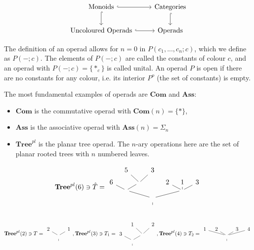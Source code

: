 \[
\begin{tikzcd}
    \text{Monoids} \arrow[r, hook] \arrow[d, hook]
    & \text{Categories} \arrow[d, hook]\\
    \text{Uncoloured Operads} \arrow[r, hook] & \text{Operads}
\end{tikzcd}
\]

The definition of an operad allows for $n = 0$ in $P(c_1,...,c_n;c)$, which we define as $P(-;c)$. The elements of $P(-;c)$ are called the constants of colour $c$, and an operad with $P(-;c) = \{*_c\}$ is called unital. An operad $P$ is open if there are no constants for any colour, i.e. its interior $P^o$ (the set of constants) is empty. 

The most fundamental examples of operads are $\mathbf{Com}$ and $\mathbf{Ass}$:
\begin{itemize}
    \item $\mathbf{Com}$ is the commutative operad with $\mathbf{Com}(n) = \{*\}$,
    \item $\mathbf{Ass}$ is the associative operad with $\mathbf{Ass}(n) = \Sigma_n$
    \item $\mathbf{Tree}^{pl}$ is the planar tree operad. The $n$-ary operations here are the set of planar rooted trees with $n$ numbered leaves. 
\end{itemize}

\[\mathbf{Tree}^{pl}(6) \ni \hat{T} = 
\begin{tikzcd}[column sep=0.8em, row sep=0.4em]
& 5\arrow[dr, dash] & & 3\arrow[dl, dash] &  &  &  \\
6 \arrow[dr, dash] &   & \arrow[dl, dash] &  & 2 \arrow[dr, dash] & 1 \arrow[d, dash] & 3 \arrow[dl, dash] \\
& \arrow[drr, dash]  &   & &  & \arrow[dll, dash] &  \\
&   &  & \arrow[d, dash] &  &  &  \\
&   &  & {} &  &  &  \\
\end{tikzcd}
\]

\[\mathbf{Tree}^{pl}(2) \ni T = 
\begin{tikzcd}[column sep=0.8em, row sep=0.4em]
2\arrow[dr, dash] & & 1\arrow[dl, dash] \\
& \arrow[d, dash] & \\
& {} &
\end{tikzcd}, \mathbf{Tree}^{pl}(3) \ni T_1 = 
\begin{tikzcd}[column sep=0.8em, row sep=0.4em]
& 1\arrow[dr, dash] & & 2\arrow[dl, dash] \\
3\arrow[dr, dash] & & \arrow[dl, dash] & \\
& \arrow[d, dash] & \\
& {} &
\end{tikzcd}, \mathbf{Tree}^{pl}(4) \ni T_2 = 
\begin{tikzcd}[column sep=0.8em, row sep=0.4em]
1\arrow[drr, dash] & 2\arrow[dr, dash] & & 3\arrow[dl, dash] & 4\arrow[dll, dash] \\
&&\arrow[d, dash]&& \\
&&{}&&
\end{tikzcd}
\]

